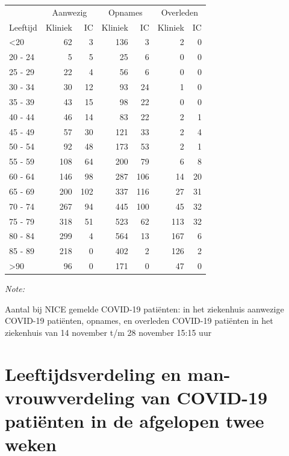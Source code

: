 \documentclass[
  english,
  man,floatsintext]{apa6}
\begin{document}
\begin{table}
\centering\begingroup\fontsize{10}{12}\selectfont

\begin{threeparttable}
\begin{tabular}{lrrrrrr}
\toprule
\multicolumn{1}{c}{ } & \multicolumn{2}{c}{Aanwezig} & \multicolumn{2}{c}{Opnames} & \multicolumn{2}{c}{Overleden} \\
\cmidrule(l{3pt}r{3pt}){2-3} \cmidrule(l{3pt}r{3pt}){4-5} \cmidrule(l{3pt}r{3pt}){6-7}
Leeftijd & Kliniek & IC & Kliniek & IC & Kliniek & IC\\
\midrule
<20 & 62 & 3 & 136 & 3 & 2 & 0\\
20 - 24 & 5 & 5 & 25 & 6 & 0 & 0\\
25 - 29 & 22 & 4 & 56 & 6 & 0 & 0\\
30 - 34 & 30 & 12 & 93 & 24 & 1 & 0\\
35 - 39 & 43 & 15 & 98 & 22 & 0 & 0\\
40 - 44 & 46 & 14 & 83 & 22 & 2 & 1\\
45 - 49 & 57 & 30 & 121 & 33 & 2 & 4\\
50 - 54 & 92 & 48 & 173 & 53 & 2 & 1\\
55 - 59 & 108 & 64 & 200 & 79 & 6 & 8\\
60 - 64 & 146 & 98 & 287 & 106 & 14 & 20\\
65 - 69 & 200 & 102 & 337 & 116 & 27 & 31\\
70 - 74 & 267 & 94 & 445 & 100 & 45 & 32\\
75 - 79 & 318 & 51 & 523 & 62 & 113 & 32\\
80 - 84 & 299 & 4 & 564 & 13 & 167 & 6\\
85 - 89 & 218 & 0 & 402 & 2 & 126 & 2\\
>90 & 96 & 0 & 171 & 0 & 47 & 0\\
\bottomrule
\end{tabular}
\begin{tablenotes}
\item \textit{Note: } 
\item Aantal bij NICE gemelde COVID-19 patiënten: in het ziekenhuis aanwezige COVID-19 patiënten, opnames, en overleden COVID-19 patiënten in het ziekenhuis van 14 november t/m 28 november 15:15 uur
\end{tablenotes}
\end{threeparttable}
\endgroup{}
\end{table}

\newpage

\hypertarget{leeftijdsverdeling-en-man-vrouwverdeling-van-covid-19-patiuxebnten-in-de-afgelopen-twee-weken}{%
\section{Leeftijdsverdeling en man-vrouwverdeling van COVID-19 patiënten in de afgelopen twee weken}\label{leeftijdsverdeling-en-man-vrouwverdeling-van-covid-19-patiuxebnten-in-de-afgelopen-twee-weken}}
\end{document}
